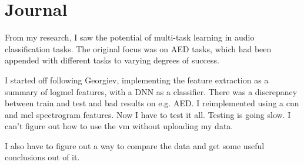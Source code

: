 \chapter{Journal}

From my research, I saw the potential of multi-task learning in audio classification tasks. The original focus was on AED tasks, which had been appended with different tasks to varying degrees of success. 

I started off following Georgiev, implementing the feature extraction as a summary of logmel features, with a DNN as a classifier. There was a discrepancy between train and test and bad results on e.g. AED. I reimplemented using a cnn and mel spectrogram features. Now I have to test it all. Testing is going slow. I can't figure out how to use the vm without uploading my data.

I also have to figure out a way to compare the data and get some useful conclusions out of it. 